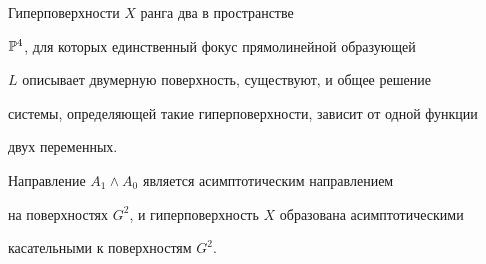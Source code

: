 \begin{thm} Гиперповерхности $X$ ранга два в пространстве


$\Bbb P^4$, для которых единственный фокус прямолинейной образующей


$L$ описывает двумерную поверхность, существуют,  и общее решение


системы, определяющей такие гиперповерхности, зависит от одной функции


двух переменных.


Направление $A_1 \wedge A_0$ является асимптотическим направлением


на поверхностях $G^2$, и гиперповерхность $X$ образована асимптотическими


касательными к поверхностям $G^2$.


\end{thm}





